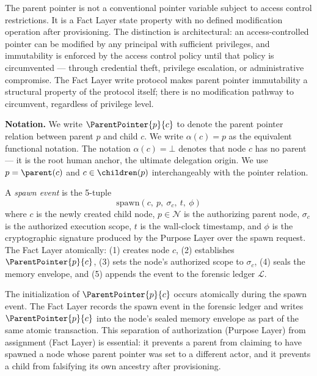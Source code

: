 The parent pointer is not a conventional pointer variable subject to access control restrictions. It is a Fact Layer state property with no defined modification operation after provisioning. The distinction is architectural: an access-controlled pointer can be modified by any principal with sufficient privileges, and immutability is enforced by the access control policy until that policy is circumvented --- through credential theft, privilege escalation, or administrative compromise. The Fact Layer write protocol makes parent pointer immutability a structural property of the protocol itself; there is no modification pathway to circumvent, regardless of privilege level.

\bigskip
\noindent\textbf{Notation.} We write $\ParentPointer{p}{c}$ to denote the parent pointer relation between parent $p$ and child $c$. We write $\alpha(c) = p$ as the equivalent functional notation. The notation $\alpha(c) = \bot$ denotes that node $c$ has no parent --- it is the root human anchor, the ultimate delegation origin. We use $p = \parent(c)$ and $c \in \children(p)$ interchangeably with the pointer relation.

\begin{dfn}
\label{dfn:spawn-event}
A \emph{spawn event} is the 5-tuple
\begin{equation}
\mathrm{spawn}(c,\ p,\ \sigma_c,\ t,\ \phi)
\end{equation}
where $c$ is the newly created child node, $p \in \mathcal{N}$ is the authorizing parent node, $\sigma_c$ is the authorized execution scope, $t$ is the wall-clock timestamp, and $\phi$ is the cryptographic signature produced by the Purpose Layer over the spawn request. The Fact Layer atomically: (1) creates node $c$, (2) establishes $\ParentPointer{p}{c}$, (3) sets the node's authorized scope to $\sigma_c$, (4) seals the memory envelope, and (5) appends the event to the forensic ledger $\mathcal{L}$.
\end{dfn}

The initialization of $\ParentPointer{p}{c}$ occurs atomically during the spawn event. The Fact Layer records the spawn event in the forensic ledger and writes $\ParentPointer{p}{c}$ into the node's sealed memory envelope as part of the same atomic transaction. This separation of authorization (Purpose Layer) from assignment (Fact Layer) is essential: it prevents a parent from claiming to have spawned a node whose parent pointer was set to a different actor, and it prevents a child from falsifying its own ancestry after provisioning.

